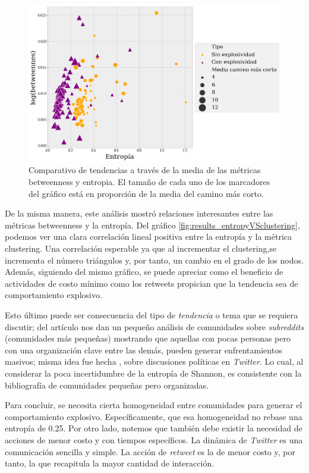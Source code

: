 \documentclass[../main.tex]{subfiles}
\begin{document}
\begin{figure}[h!]
    \centering
    \includegraphics[scale = 0.40]{images/results_entropyVSbetweennes.png}
    \caption{Comparativo de tendencias a través de la media de las métricas betweenness y entropia. El tamaño de cada uno de los marcadores del gráfico está en proporción de la media del camino más corto. }
    \label{fig:results_entropyVSbetweeness}
\end{figure}

De la misma manera, este análisis mostró relaciones interesantes entre las métricas betweenness y la entropía. Del gráfico \ref{fig:results_entropyVSclustering}, podemos ver una clara correlación lineal positiva entre la entropía y la métrica clustering. Una correlación esperable ya que al incrementar el clustering,se incrementa el número triángulos y, por tanto, un cambio en el grado de los nodos. Además, siguiendo del mismo gráfico, se puede apreciar como el beneficio de actividades de costo mínimo como los retweets propician que la tendencia sea de comportamiento explosivo.

Esto último puede ser consecuencia del tipo de \textit{tendencia} o tema que se requiera discutir; del artículo \cite{REDDIT} nos dan un pequeño análisis de comunidades sobre \textit{subreddits} (comunidades más pequeñas) mostrando que aquellas con pocas personas pero con una organización clave entre las demás, pueden generar enfrentamientos masivos; misma idea fue hecha \cite{Conover_Ratkiewicz_Francisco_Goncalves_Menczer_Flammini_2011}, sobre discusiones políticas en \textit{Twitter}. Lo cual, al considerar la poca incertidumbre de la entropía de Shannon, es consistente con la bibliografía de comunidades pequeñas pero organizadas.

Para concluir, se necesita cierta homogeneidad entre comunidades para generar el comportamiento explosivo. Específicamente, que esa homogeneidad no rebase una entropía de 0.25. Por otro lado, notemos que también debe existir la necesidad de acciones de menor costo y con tiempos específicos. La dinámica de \textit{Twitter} es una comunicación sencilla y simple. La acción de \textit{retweet} es la de menor costo y, por tanto, la que recapitula la mayor cantidad de interacción.
\end{document}
